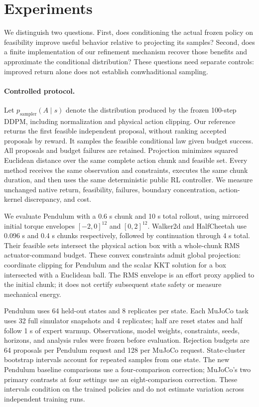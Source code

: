 \section{Experiments}
\label{sec:experiments}

We distinguish two questions. First, does conditioning the actual frozen policy
on feasibility improve useful behavior relative to projecting its samples?
Second, does a finite implementation of our refinement mechanism recover those
benefits and approximate the conditional distribution? These questions need
separate controls: improved return alone does not establish conwhaditional sampling.

\paragraph{Controlled protocol.}
Let $p_{\mathrm{sampler}}(A\mid s)$ denote the distribution produced by the
frozen 100-step DDPM, including normalization and physical action clipping.
Our reference returns the first feasible independent proposal, without ranking
accepted proposals by reward. It samples the feasible conditional law given
budget success. All proposals and budget failures are retained. Projection
minimizes squared Euclidean distance over the same complete action chunk and
feasible set. Every method receives the same observation and constraints,
executes the same chunk duration, and then uses the same deterministic public
RL controller. We measure unchanged native return, feasibility, failures,
boundary concentration, action-kernel discrepancy, and cost.

We evaluate Pendulum with a 0.6 s chunk and 10 s total rollout, using mirrored
initial torque envelopes $[-2,0]^{12}$ and $[0,2]^{12}$. Walker2d and HalfCheetah
use 0.096 s and 0.4 s chunks respectively, followed by continuation through
4 s total. Their feasible sets intersect the physical action box with a
whole-chunk RMS actuator-command budget. These convex constraints admit
global projection: coordinate clipping for Pendulum and the scalar KKT
solution for a box intersected with a Euclidean ball. The RMS envelope is
an effort proxy applied to the initial chunk; it does not certify subsequent
state safety or measure mechanical energy.

Pendulum uses 64 held-out states and 8 replicates per state. Each MuJoCo task
uses 32 full simulator snapshots and 4 replicates; half are reset states and
half follow 1 s of expert warmup. Observations, model weights, constraints,
seeds, horizons, and analysis rules were frozen before evaluation. Rejection
budgets are 64 proposals per Pendulum request and 128 per MuJoCo request.
State-cluster bootstrap intervals account for repeated samples from one state.
The new Pendulum baseline comparisons use a four-comparison correction;
MuJoCo's two primary contrasts at four settings use an eight-comparison
correction. These intervals condition on the trained policies and do not
estimate variation across independent training runs.

